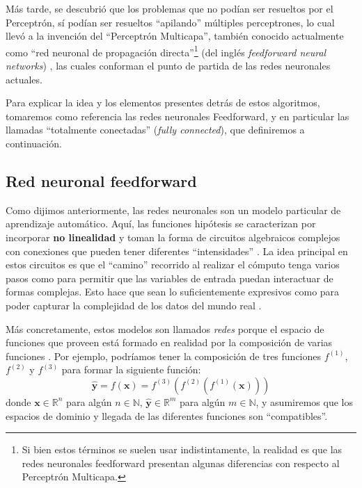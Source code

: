 \documentclass[../../main.tex]{subfiles}
\begin{document}
Más tarde, se descubrió que los problemas que no podían ser resueltos por el Perceptrón,
sí podían ser resueltos ``apilando'' múltiples perceptrones, lo cual llevó a la invención
del ``Perceptrón Multicapa'', también conocido actualmente como ``red neuronal de
propagación directa''\footnote{Si bien estos términos se suelen usar indistintamente, la
realidad es que las redes neuronales feedforward presentan algunas diferencias con
respecto al Perceptrón Multicapa.} (del inglés \textit{feedforward neural networks})
\cite{deep-learning}, las cuales conforman el punto de partida de las redes neuronales
actuales.

Para explicar la idea y los elementos presentes detrás de estos algoritmos, tomaremos como
referencia las redes neuronales Feedforward, y en particular las llamadas ``totalmente
conectadas'' (\textit{fully connected}), que definiremos a continuación.

\subsection{Red neuronal feedforward}
Como dijimos anteriormente, las redes neuronales son un modelo particular de aprendizaje
automático. Aquí, las funciones hipótesis se caracterizan por incorporar \textbf{no
linealidad} y toman la forma de circuitos algebraicos complejos con conexiones que pueden
tener diferentes ``intensidades'' \cite{ai-a-modern-approach}. La idea principal en estos
circuitos es que el ``camino'' recorrido al realizar el cómputo tenga varios pasos como
para permitir que las variables de entrada puedan interactuar de formas complejas. Esto
hace que sean lo suficientemente expresivos como para poder capturar la complejidad de los
datos del mundo real \cite{ai-a-modern-approach}.

Más concretamente, estos modelos son llamados \textit{redes} porque el espacio de
funciones que proveen está formado en realidad por la composición de varias funciones
\cite{deep-learning}. Por ejemplo, podríamos tener la composición de tres funciones
\(f^{(1)}\), \(f^{(2)}\) y \(f^{(3)}\) para formar la siguiente función:
\begin{equation}
    \hat{\bm{y}} = f(\bm{x}) = f^{(3)}(f^{(2)}(f^{(1)}(\bm{x})))
    \label{eq:fun-composition}
\end{equation}
donde \(\bm{x} \in \mathbb{R}^n\) para algún \(n \in \mathbb{N}\), \(\hat{\bm{y}} \in
\mathbb{R}^m\) para algún \(m \in \mathbb{N}\), y asumiremos que los espacios de dominio y
llegada de las diferentes funciones son ``compatibles''.
\end{document}
